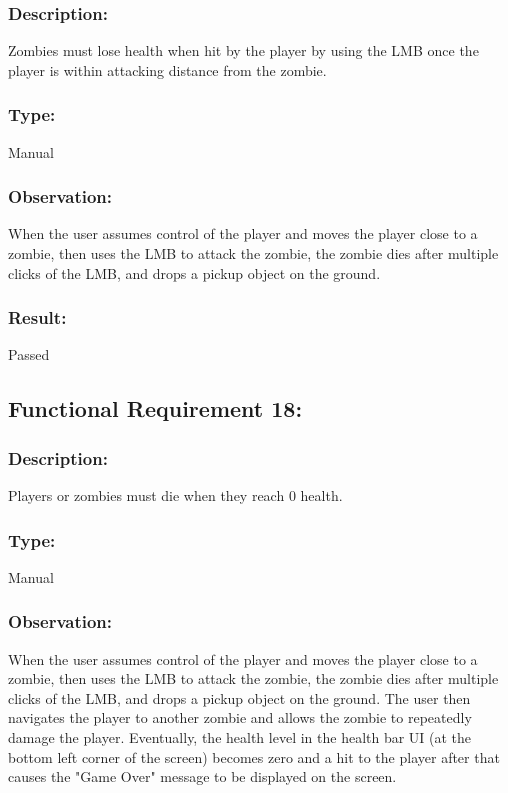 \documentclass[12pt, titlepage]{article}
\begin{document}
\subsubsection{Description: }Zombies must lose health when hit by the player by using the LMB once the player is within attacking distance from the zombie.

\subsubsection{Type: } Manual

\subsubsection{Observation: } When the user assumes control of the player and moves the player close to a zombie, then uses the LMB to attack the zombie, the zombie dies after multiple clicks of the LMB, and drops a pickup object on the ground.

\subsubsection[Pass / Fail:] {Result: } Passed


\subsection{Functional Requirement 18: } 

\subsubsection{Description: }Players or zombies must die when they reach 0 health.

\subsubsection{Type: } Manual

\subsubsection{Observation: } When the user assumes control of the player and moves the player close to a zombie, then uses the LMB to attack the zombie, the zombie dies after multiple clicks of the LMB, and drops a pickup object on the ground. The user then navigates the player to another zombie and allows the zombie to repeatedly damage the player. Eventually, the health level in the health bar UI (at the bottom left corner of the screen) becomes zero and a hit to the player after that causes the "Game Over" message to be displayed on the screen.
\end{document}
